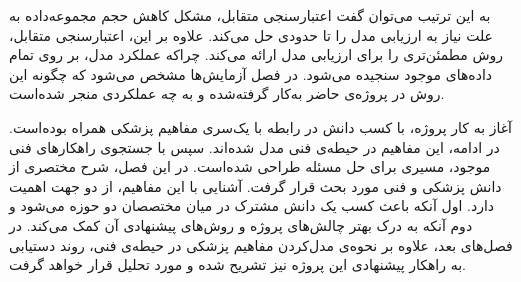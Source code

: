 به این ترتیب می‌توان گفت اعتبارسنجی متقابل، مشکل کاهش حجم مجموعه‌داده به علت نیاز به ارزیابی مدل را تا حدودی حل می‌کند.
علاوه بر این، اعتبارسنجی متقابل، روش مطمئن‌تری را برای ارزیابی مدل ارائه می‌کند.
چراکه عملکرد مدل، بر روی تمام داده‌های موجود سنجیده می‌شود.
در فصل آزمایش‌ها مشخص می‌شود که چگونه این روش در پروژه‌ی حاضر به‌کار گرفته‌شده و به چه عملکردی منجر شده‌است.


آغاز به کار پروژه، با کسب دانش در رابطه با یک‌سری مفاهیم 
پزشکی همراه بوده‌است.
در ادامه، این مفاهیم در حیطه‌ی فنی مدل شده‌اند.
سپس با جستجوی راهکار‌های فنی موجود، مسیری برای 
حل مسئله طراحی شده‌است.
در این فصل، شرح مختصری از دانش پزشکی و فنی مورد 
بحث قرار گرفت.
آشنایی با این مفاهیم، از دو جهت اهمیت دارد.
اول آنکه باعث کسب یک دانش مشترک در میان مختصصان دو حوزه می‌شود و دوم آنکه به درک بهتر چالش‌های پروژه و روش‌های پیشنهادی آن کمک می‌کند. 
در فصل‌های بعد، 
علاوه بر نحوه‌ی مدل‌کردن مفاهیم پزشکی در حیطه‌ی فنی، روند دستیابی به راهکار پیشنهادی این پروژه نیز
تشریح شده و مورد تحلیل قرار خواهد گرفت.
